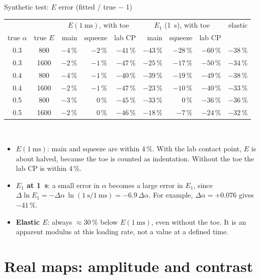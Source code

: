 \documentclass[aspectratio=169,9pt]{beamer}
\begin{document}
\begin{frame}{Synthetic test: $E$ error (fitted / true $-$ 1)}
\small
\centering
\begin{tabular}{@{}cc|rrr|rrr|r@{}}
\toprule
 & & \multicolumn{3}{c|}{$E(\SI{1}{\milli\second})$, with toe} & \multicolumn{3}{c|}{$E_1$ (\SI{1}{\second}), with toe} & elastic\\
true $\alpha$ & true $E$ & main & squeeze & lab CP & main & squeeze & lab CP & \\
\midrule
0.3 & 800 & $-4$\,\% & $-2$\,\% & $-41$\,\% & $-43$\,\% & $-28$\,\% & $-60$\,\% & $-38$\,\%\\
0.3 & 1600 & $-2$\,\% & $-1$\,\% & $-47$\,\% & $-25$\,\% & $-17$\,\% & $-50$\,\% & $-34$\,\%\\
0.4 & 800 & $-4$\,\% & $-1$\,\% & $-40$\,\% & $-39$\,\% & $-19$\,\% & $-49$\,\% & $-38$\,\%\\
0.4 & 1600 & $-2$\,\% & $-1$\,\% & $-47$\,\% & $-23$\,\% & $-10$\,\% & $-40$\,\% & $-33$\,\%\\
0.5 & 800 & $-3$\,\% & 0\,\% & $-45$\,\% & $-33$\,\% & 0\,\% & $-36$\,\% & $-36$\,\%\\
0.5 & 1600 & $-2$\,\% & 0\,\% & $-46$\,\% & $-18$\,\% & $-7$\,\% & $-24$\,\% & $-32$\,\%\\
\bottomrule
\end{tabular}\\[8pt]
\raggedright
\begin{itemize}
\item \textbf{$E(\SI{1}{\milli\second})$}: main and squeeze are within 4\,\%. With the lab contact point, $E$ is about halved, because the toe is counted as indentation. Without the toe the lab CP is within 4\,\%.
\item \textbf{$E_1$ at \SI{1}{\second}}: a small error in $\alpha$ becomes a large error in $E_1$, since $\Delta\ln E_1=-\Delta\alpha\,\ln(\SI{1}{\second}/\SI{1}{\milli\second})=-6.9\,\Delta\alpha$. For example, $\Delta\alpha=+0.076$ gives $-41\,\%$.
\item \textbf{Elastic $E$}: always $\approx30\,\%$ below $E(\SI{1}{\milli\second})$, even without the toe. It is an apparent modulus at this loading rate, not a value at a defined time.
\end{itemize}
\end{frame}

\section{Real maps: amplitude and contrast}
\end{document}
